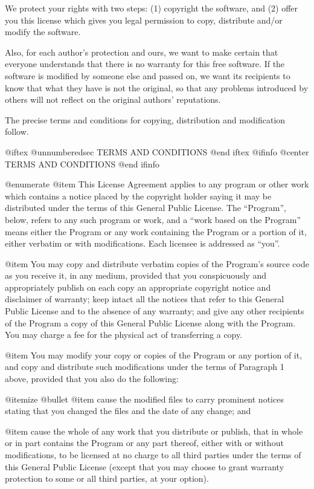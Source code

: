   We protect your rights with two steps: (1) copyright the software, and
(2) offer you this license which gives you legal permission to copy,
distribute and/or modify the software.

  Also, for each author's protection and ours, we want to make certain
that everyone understands that there is no warranty for this free
software.  If the software is modified by someone else and passed on, we
want its recipients to know that what they have is not the original, so
that any problems introduced by others will not reflect on the original
authors' reputations.

  The precise terms and conditions for copying, distribution and
modification follow.

@iftex
@unnumberedsec TERMS AND CONDITIONS
@end iftex
@ifinfo
@center TERMS AND CONDITIONS
@end ifinfo

@enumerate
@item
This License Agreement applies to any program or other work which
contains a notice placed by the copyright holder saying it may be
distributed under the terms of this General Public License.  The
``Program'', below, refers to any such program or work, and a ``work based
on the Program'' means either the Program or any work containing the
Program or a portion of it, either verbatim or with modifications.  Each
licensee is addressed as ``you''.

@item
You may copy and distribute verbatim copies of the Program's source
code as you receive it, in any medium, provided that you conspicuously and
appropriately publish on each copy an appropriate copyright notice and
disclaimer of warranty; keep intact all the notices that refer to this
General Public License and to the absence of any warranty; and give any
other recipients of the Program a copy of this General Public License
along with the Program.  You may charge a fee for the physical act of
transferring a copy.

@item
You may modify your copy or copies of the Program or any portion of
it, and copy and distribute such modifications under the terms of Paragraph
1 above, provided that you also do the following:

@itemize @bullet
@item
cause the modified files to carry prominent notices stating that
you changed the files and the date of any change; and

@item
cause the whole of any work that you distribute or publish, that
in whole or in part contains the Program or any part thereof, either
with or without modifications, to be licensed at no charge to all
third parties under the terms of this General Public License (except
that you may choose to grant warranty protection to some or all
third parties, at your option).

